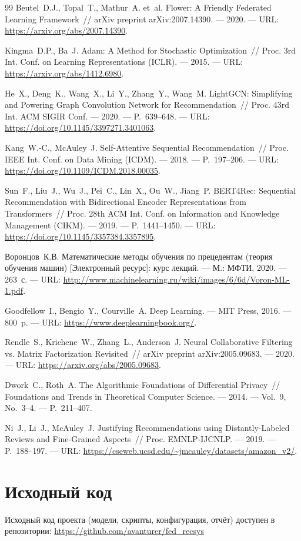 \documentclass[14pt,a4paper]{extarticle}
\begin{document}
\begin{thebibliography}{99}
Beutel~D.J., Topal~T., Mathur~A. et~al.
Flower: A Friendly Federated Learning Framework~//
arXiv preprint arXiv:2007.14390. --- 2020. --- URL: \url{https://arxiv.org/abs/2007.14390}.

Kingma~D.P., Ba~J.
Adam: A Method for Stochastic Optimization~//
Proc. 3rd Int. Conf. on Learning Representations (ICLR). --- 2015. --- URL: \url{https://arxiv.org/abs/1412.6980}.

He~X., Deng~K., Wang~X., Li~Y., Zhang~Y., Wang~M.
LightGCN: Simplifying and Powering Graph Convolution Network for Recommendation~//
Proc. 43rd Int. ACM SIGIR Conf. --- 2020. --- P.~639--648. --- URL: \url{https://doi.org/10.1145/3397271.3401063}.

Kang~W.-C., McAuley~J.
Self-Attentive Sequential Recommendation~//
Proc. IEEE Int. Conf. on Data Mining (ICDM). --- 2018. --- P.~197--206. --- URL: \url{https://doi.org/10.1109/ICDM.2018.00035}.

Sun~F., Liu~J., Wu~J., Pei~C., Lin~X., Ou~W., Jiang~P.
BERT4Rec: Sequential Recommendation with Bidirectional Encoder Representations from Transformers~//
Proc. 28th ACM Int. Conf. on Information and Knowledge Management (CIKM). --- 2019. --- P.~1441--1450. --- URL: \url{https://doi.org/10.1145/3357384.3357895}.

Воронцов~К.В.
Математические методы обучения по прецедентам (теория обучения машин) [Электронный ресурс]: курс лекций.
--- М.: МФТИ, 2020. --- 263~с. --- URL: \url{http://www.machinelearning.ru/wiki/images/6/6d/Voron-ML-1.pdf}.

Goodfellow~I., Bengio~Y., Courville~A.
Deep Learning.
--- MIT Press, 2016. --- 800~p. --- URL: \url{https://www.deeplearningbook.org/}.

Rendle~S., Krichene~W., Zhang~L., Anderson~J.
Neural Collaborative Filtering vs. Matrix Factorization Revisited~//
arXiv preprint arXiv:2005.09683. --- 2020. --- URL: \url{https://arxiv.org/abs/2005.09683}.

Dwork~C., Roth~A.
The Algorithmic Foundations of Differential Privacy~//
Foundations and Trends in Theoretical Computer Science. --- 2014. --- Vol.~9, No.~3--4. --- P.~211--407.

Ni~J., Li~J., McAuley~J.
Justifying Recommendations using Distantly-Labeled Reviews and Fine-Grained Aspects~//
Proc. EMNLP-IJCNLP. --- 2019. --- P.~188--197. --- URL: \url{https://cseweb.ucsd.edu/~jmcauley/datasets/amazon_v2/}.

\end{thebibliography}

\newpage

\section*{Исходный код}

Исходный код проекта (модели, скрипты, конфигурация, отчёт) доступен в репозитории: \url{https://github.com/avanturer/fed_recsys}
\end{document}
